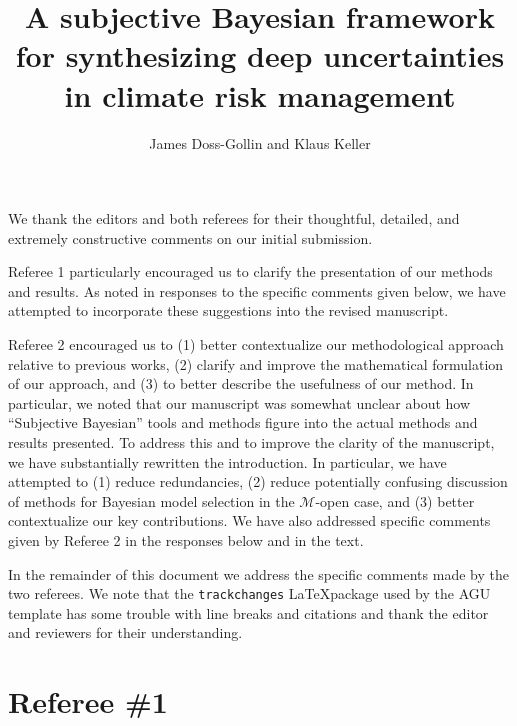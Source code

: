 \documentclass{ar2rc}
\title{A subjective Bayesian framework for synthesizing deep uncertainties in climate risk management}
\author{James Doss-Gollin and Klaus Keller}
\begin{document}
\maketitle

We thank the editors and both referees for their thoughtful, detailed, and extremely constructive comments on our initial submission.

Referee 1 particularly encouraged us to clarify the presentation of our methods and results.
As noted in responses to the specific comments given below, we have attempted to incorporate these suggestions into the revised manuscript.

Referee 2 encouraged us to (1) better contextualize our methodological approach relative to previous works, (2) clarify and improve the mathematical formulation of our approach, and (3) to better describe the usefulness of our method.
In particular, we noted that our manuscript was somewhat unclear about how ``Subjective Bayesian'' tools and methods figure into the actual methods and results presented.
To address this and to improve the clarity of the manuscript, we have substantially rewritten the introduction.
In particular, we have attempted to (1) reduce redundancies, (2) reduce potentially confusing discussion of methods for Bayesian model selection in the $\mathcal{M}$-open case, and (3) better contextualize our key contributions.
We have also addressed specific comments given by Referee 2 in the responses below and in the text.

In the remainder of this document we address the specific comments made by the two referees.
We note that the \texttt{trackchanges} \LaTeX package used by the AGU template has some trouble with line breaks and citations and thank the editor and reviewers for their understanding.

\section{Referee \#1}
\end{document}
